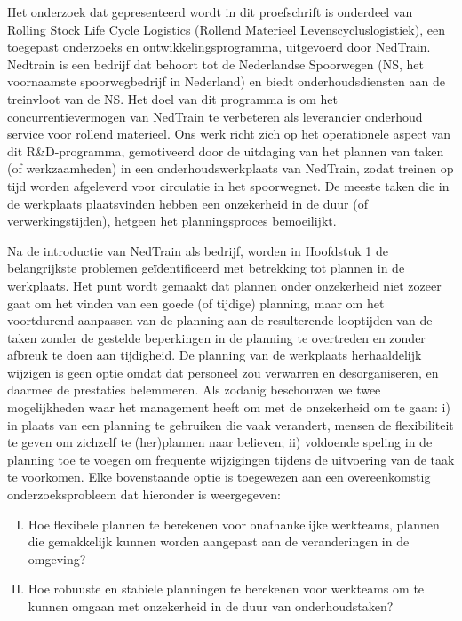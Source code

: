 Het onderzoek dat gepresenteerd wordt in dit proefschrift is onderdeel van Rolling Stock Life Cycle Logistics (Rollend Materieel Levenscycluslogistiek), 
een toegepast onderzoeks en ontwikkelingsprogramma, uitgevoerd door NedTrain. 
Nedtrain is een bedrijf dat behoort tot de Nederlandse Spoorwegen (NS, het voornaamste spoorwegbedrijf in Nederland) 
en biedt onderhoudsdiensten aan de treinvloot van de NS. 
Het doel van dit programma is om het concurrentievermogen van NedTrain te verbeteren als leverancier onderhoud service voor rollend materieel. 
Ons werk richt zich op het operationele aspect van dit R\&D-programma, 
gemotiveerd door de uitdaging van het plannen van taken (of werkzaamheden) in een onderhouds\-werkplaats van NedTrain, 
zodat treinen op tijd worden afgeleverd voor circulatie in het spoorwegnet. 
De meeste taken die in de werkplaats plaatsvinden hebben een onzekerheid in de duur (of verwerkingstijden), 
hetgeen het plannings\-proces bemoeilijkt.

Na de introductie van NedTrain als bedrijf, 
worden in Hoofdstuk 1 de belangrijkste problemen geïdentificeerd met betrekking tot plannen in de werkplaats. 
Het punt wordt gemaakt dat plannen onder onzekerheid niet zozeer gaat om het vinden van een goede (of tijdige) planning, 
maar om het voortdurend aanpassen van de planning aan de resulterende looptijden van de taken zonder de gestelde beperkingen 
in de planning te overtreden en zonder afbreuk te doen aan tijdigheid. 
De planning van de werkplaats herhaaldelijk wijzigen is geen optie omdat dat personeel zou verwarren en desorganiseren, 
en daarmee de prestaties belemmeren. Als zodanig beschouwen we twee mogelijkheden waar het management heeft om met de onzekerheid om te gaan: 
i) in plaats van een planning te gebruiken die vaak verandert, mensen de flexibiliteit te geven om zichzelf te (her)plannen naar believen; 
ii) voldoende speling in de planning toe te voegen om frequente wijzigingen tijdens de uitvoering van de taak te voorkomen. 
Elke bovenstaande optie is toegewezen aan een overeenkomstig onderzoeksprobleem dat hieronder is weer\-gegeven: 

\begin{enumerate}[(I)]
\item{Hoe flexibele plannen te berekenen voor onafhankelijke werkteams, plannen die gemakkelijk kunnen worden aangepast aan de veranderingen in de omgeving?}
\item{Hoe robuuste en stabiele planningen te berekenen voor werkteams om te kunnen omgaan met onzekerheid in de duur van onderhoudstaken?}
\end{enumerate}

